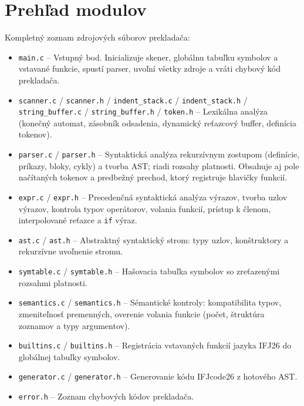 \section{Prehľad modulov}
Kompletný zoznam zdrojových súborov prekladača:
\begin{itemize}
    \item \texttt{main.c} -- Vstupný bod. Inicializuje skener, globálnu tabuľku symbolov a vstavané funkcie, spustí parser, uvoľní všetky zdroje a vráti chybový kód prekladača.
    \item \texttt{scanner.c} / \texttt{scanner.h} / \texttt{indent\_stack.c} / \texttt{indent\_stack.h} / \texttt{string\_buffer.c} / \texttt{string\_buffer.h} / \texttt{token.h} -- Lexikálna analýza (konečný automat, zásobník odsadenia, dynamický reťazcový buffer, definícia tokenov).
    \item \texttt{parser.c} / \texttt{parser.h} -- Syntaktická analýza rekurzívnym zostupom (definície, príkazy, bloky, cykly) a tvorba AST; riadi rozsahy platnosti. Obsahuje aj pole načítaných tokenov a predbežný prechod, ktorý registruje hlavičky funkcií.
    \item \texttt{expr.c} / \texttt{expr.h} -- Precedenčná syntaktická analýza výrazov, tvorba uzlov výrazov, kontrola typov operátorov, volania funkcií, prístup k členom, interpolované reťazce a \texttt{if} výraz.
    \item \texttt{ast.c} / \texttt{ast.h} -- Abstraktný syntaktický strom: typy uzlov, konštruktory a rekurzívne uvoľnenie stromu.
    \item \texttt{symtable.c} / \texttt{symtable.h} -- Hašovacia tabuľka symbolov so zreťazenými rozsahmi platnosti.
    \item \texttt{semantics.c} / \texttt{semantics.h} -- Sémantické kontroly: kompatibilita typov, zmeniteľnosť premenných, overenie volania funkcie (počet, štruktúra zoznamov a typy argumentov).
    \item \texttt{builtins.c} / \texttt{builtins.h} -- Registrácia vstavaných funkcií jazyka IFJ26 do globálnej tabuľky symbolov.
    \item \texttt{generator.c} / \texttt{generator.h} -- Generovanie kódu IFJcode26 z hotového AST.
    \item \texttt{error.h} -- Zoznam chybových kódov prekladača.
\end{itemize}

